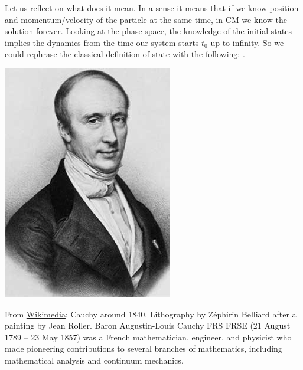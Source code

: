 \documentclass[../main.tex]{subfiles}
\begin{document}
Let us reflect on what does it mean. In a sense it means that if we know position and momentum/velocity of the particle at the same time, in CM we know the solution forever. Looking at the phase space, the knowledge of the initial states implies the dynamics from the time our system starts $t_0$ up to infinity. So we could rephrase the classical definition of state with the following:
.\begin{marginfigure}
	\includegraphics[width=1\linewidth]{images/Augustin-Louis_Cauchy_1901.jpg}
	\caption[Cauchy around 1840. Lithography by Zéphirin Belliard after a painting by Jean Roller.]{From \href{https://it.wikipedia.org/wiki/Augustin-Louis_Cauchy}{Wikimedia}: Cauchy around 1840. Lithography by Zéphirin Belliard after a painting by Jean Roller. Baron Augustin-Louis Cauchy FRS FRSE (21 August 1789 – 23 May 1857) was a French mathematician, engineer, and physicist who made pioneering contributions to several branches of mathematics, including mathematical analysis and continuum mechanics.}
\end{marginfigure}
\end{document}
